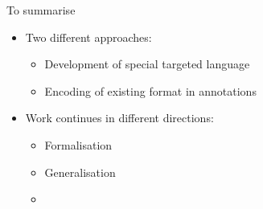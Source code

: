 \documentclass[final,nocolorBG,a4,marieke,nototal,ps, accumulate,slideColor]{prosper}
\begin{document}

\begin{slide}{To summarise}
\begin{itemize}
\item Two different approaches: 
\begin{itemize}
\item Development of special targeted language 
\item Encoding of existing format in annotations
\end{itemize}
\item Work continues in different directions:
\begin{itemize}
\item Formalisation
\item Generalisation
\item 
\end{itemize}
\end{itemize}
\end{slide}
\end{document}
